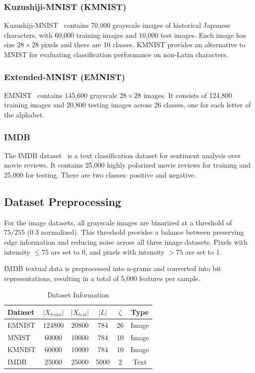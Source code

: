 \documentclass[sn-mathphys-num]{sn-jnl}%
\theoremstyle{thmstyleone}%
\theoremstyle{thmstyletwo}%
\theoremstyle{thmstylethree}%
\begin{document}
\subsubsection{Kuzushiji-MNIST (KMNIST)}
Kuzushiji-MNIST~\cite{kmnist} contains 70,000 grayscale images of historical Japanese characters, with 60,000 training images and 10,000 test images. Each image has size $28 \times 28$ pixels and there are 10 classes. KMNIST provides an alternative to MNIST for evaluating classification performance on non-Latin characters.

\subsubsection{Extended-MNIST (EMNIST)}
EMNIST~\cite{DBLP:EMNIST} contains 145,600 grayscale $28 \times 28$ images. It consists of 124,800 training images and 20,800 testing images across 26 classes, one for each letter of the alphabet.

\subsubsection{IMDB}
The IMDB dataset~\cite{maas-EtAl:2011:ACL-HLT2011} is a text classification dataset for sentiment analysis over movie reviews. It contains 25,000 highly polarized movie reviews for training and 25,000 for testing. There are two classes: positive and negative. 

\subsection{Dataset Preprocessing}
For the image datasets, all grayscale images are binarized at a threshold of $75/255$ (0.3 normalized). This threshold provides a balance between preserving edge information and reducing noise across all three image datasets. Pixels with intensity $\leq 75$ are set to 0, and pixels with intensity $>75$ are set to 1.

IMDB textual data is preprocessed into n-grams and converted into bit representations, resulting in a total of 5,000 features per sample.

\begin{table}
\centering
\caption{Dataset Information}
\begin{tabular}{|l|c|c|c|c|c|}
\hline
Dataset & $|X_{train}|$ & $|X_{test}|$ & $|L|$ & $\zeta$ & Type\\
\hline
EMNIST & 124800 & 20800 & 784 & 26 & Image \\\hline
MNIST & 60000 & 10000 & 784 & 10 & Image \\\hline
KMNIST & 60000 & 10000 & 784 & 10 & Image \\\hline
IMDB & 25000 & 25000 & 5000 & 2 & Text \\
\hline
\end{tabular}
\label{tab:dataset-size}
\end{table}
\end{document}
